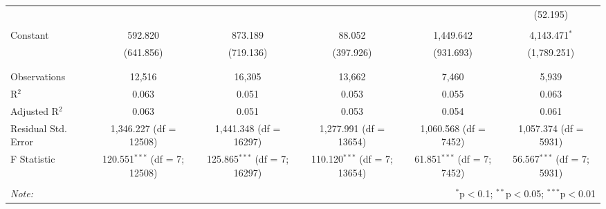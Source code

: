 \begin{table}[!htbp]
\begin{tabular}{@{\extracolsep{5pt}}lccccc}
  &  &  &  &  & (52.195) \\ 
  & & & & & \\ 
 Constant & 592.820 & 873.189 & 88.052 & 1,449.642 & 4,143.471$^{*}$ \\ 
  & (641.856) & (719.136) & (397.926) & (931.693) & (1,789.251) \\ 
  & & & & & \\ 
\hline \\[-1.8ex] 
Observations & 12,516 & 16,305 & 13,662 & 7,460 & 5,939 \\ 
R$^{2}$ & 0.063 & 0.051 & 0.053 & 0.055 & 0.063 \\ 
Adjusted R$^{2}$ & 0.063 & 0.051 & 0.053 & 0.054 & 0.061 \\ 
Residual Std. Error & 1,346.227 (df = 12508) & 1,441.348 (df = 16297) & 1,277.991 (df = 13654) & 1,060.568 (df = 7452) & 1,057.374 (df = 5931) \\ 
F Statistic & 120.551$^{***}$ (df = 7; 12508) & 125.865$^{***}$ (df = 7; 16297) & 110.120$^{***}$ (df = 7; 13654) & 61.851$^{***}$ (df = 7; 7452) & 56.567$^{***}$ (df = 7; 5931) \\ 
\hline 
\hline \\[-1.8ex] 
\textit{Note:}  & \multicolumn{5}{r}{$^{*}$p$<$0.1; $^{**}$p$<$0.05; $^{***}$p$<$0.01} \\ 
\end{tabular} 
\end{table} 
